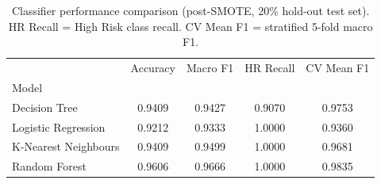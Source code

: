 \begin{table}[h]
\caption{Classifier performance comparison (post-SMOTE, 20\% hold-out test set). HR Recall = High Risk class recall. CV Mean F1 = stratified 5-fold macro F1.}
\label{tab:model_comparison}
\begin{tabular}{lcccc}
\toprule
 & Accuracy & Macro F1 & HR Recall & CV Mean F1 \\
Model &  &  &  &  \\
\midrule
Decision Tree & 0.9409 & 0.9427 & 0.9070 & 0.9753 \\
Logistic Regression & 0.9212 & 0.9333 & 1.0000 & 0.9360 \\
K-Nearest Neighbours & 0.9409 & 0.9499 & 1.0000 & 0.9681 \\
Random Forest & 0.9606 & 0.9666 & 1.0000 & 0.9835 \\
\bottomrule
\end{tabular}
\end{table}
